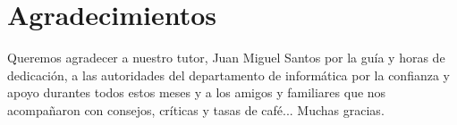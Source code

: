 
\section{Agradecimientos}
\label{agradecimientos}

Queremos agradecer a nuestro tutor, Juan Miguel Santos por la gu\'ia y 
horas de dedicaci\'on, a las autoridades del departamento de inform\'atica 
por la confianza y apoyo durantes todos estos meses y a los amigos y familiares  
que nos  acompa\~naron con consejos, cr\'iticas y tasas de caf\'e... Muchas gracias.
